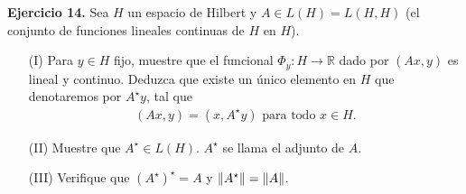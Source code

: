 \textbf{Ejercicio 14.} Sea $H$ un espacio de Hilbert y $A\in L(H)=L(H,H)$ (el conjunto de funciones lineales continuas de $H$ en $H$).
\begin{enumerate}
    \item[(I)] Para $y \in H$ fijo, muestre que el funcional $\Phi_y:H\to \mathbb{R}$ dado por $(Ax,y)$ es lineal y continuo. Deduzca que existe un único elemento en $H$ que denotaremos por $A^\star y$, tal que 
    \begin{align*}
        (Ax,y)=(x,A^\star y) \text{ para todo } x \in H.
    \end{align*}
    \item[(II)] Muestre que $A^\star \in L(H)$. $A^\star$ se llama el adjunto de $A$.
    \item[(III)] Verifique que $(A^\star)^\star=A$ y $\left\|A^\star\right\|=\left\|A\right\|$.
\end{enumerate}
